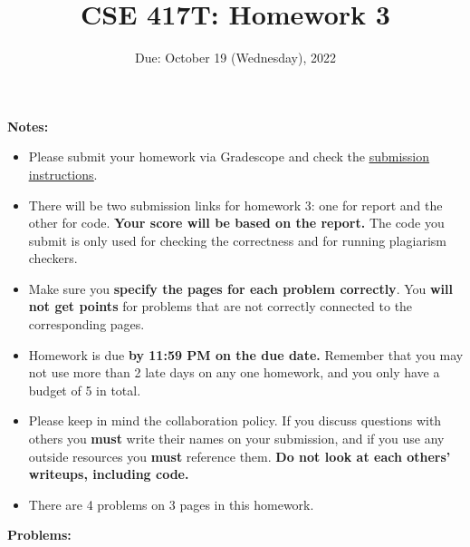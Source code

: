 \documentclass[11pt]{article}
\begin{document}
\title{CSE 417T: Homework 3}
\date{Due: October 19 (Wednesday), 2022}

\vspace{-20pt}
\maketitle

\noindent \textbf{Notes: } 
\begin{itemize}

\item Please submit your homework via Gradescope and check the \href{http://chienjuho.com/courses/cse417t/hw_instructions.html}{\underline{submission instructions}}.

\vspace{-5pt}
\item There will be two submission links for homework 3: one for report and the other for code. \textbf{Your score will be based on the report.} The code you submit is only used for checking the correctness and for running plagiarism checkers.

\vspace{-5pt}
\item Make sure you \textbf{specify the pages for each problem correctly}. You \textbf{will not get points} for problems that are not correctly connected to the corresponding pages.

\vspace{-5pt}
\item Homework is due \textbf{by 11:59 PM on the due date.} Remember that
  you may not use more than 2 late days on any one homework, and you
  only have a budget of 5 in total.

\vspace{-5pt}
\item Please keep in mind the collaboration policy.
  If you discuss questions with 
others you \textbf{must} write their names on your submission, and if
you use any outside resources you \textbf{must} reference
them. \textbf{Do not look at each others' writeups, including code.}

\vspace{-5pt}
\item There are 4 problems on 3 pages in this homework. 

\end{itemize}

\noindent \textbf{Problems:}
\end{document}
